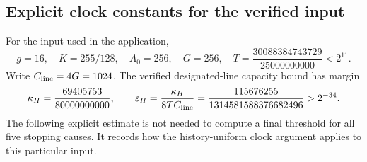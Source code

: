 \subsection{Explicit clock constants for the verified input}

For the input used in the application,
\[
 g=16,\quad K=255/128,\quad A_0=256,\quad G=256,
 \quad T=\frac{30088384743729}{25000000000}<2^{11}.
\]
Write \(C_{\rm line}=4G=1024\). The verified designated-line
capacity bound has margin
\[
 \kappa_H=\frac{69405753}{80000000000},\qquad
 \varepsilon_H=\frac{\kappa_H}{8TC_{\rm line}}
       =\frac{115676255}{1314581588376682496}>2^{-34}.
\]
The following explicit estimate is not needed to compute a final
threshold for all five stopping causes. It records how the
history-uniform clock argument applies to this particular input.

